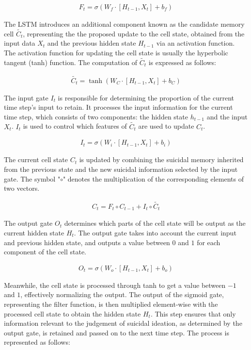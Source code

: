 \documentclass[ %
                    author={Bocheng Wang},
                supervisor={Dr. Qiang Liu},
                    degree={MSc},
                     title={A Research on Identification of Suicide Ideation in Texts with Multiple Models},
                      type={},
                      year={2024}]{dissertation}
\begin{document}
\begin{eqnarray}
      F_t = \sigma(W_f\cdot[H_{t-1}, X_t] + b_f)
      \label{forgetgate}
\end{eqnarray}

The LSTM introduces an additional component known as the candidate memory cell $\tilde{C_t}$, representing the the proposed update to the cell state, obtained from the input data $X_t$ and the previous hidden state $H_{t-1}$ via an activation function. The activation function for updating the cell state is usually the hyperbolic tangent (tanh) function. The computation of $\tilde{C_t}$ is expressed as follows:

\begin{eqnarray}
      \tilde{C_t} = \tanh(W_C\cdot[H_{t-1}, X_t] + b_C)
      \label{ctilde}
\end{eqnarray}

The input gate $I_t$ is responsible for determining the proportion of the current time step's input to retain. It processes the input information for the current time step, which consists of two components: the hidden state $h_{t-1}$ and the input $X_t$. $I_t$ is used to control which features of $\tilde{C_t}$ are used to update $C_t$.

\begin{eqnarray}
      I_t = \sigma(W_i\cdot[H_{t-1}, X_t] + b_i)
      \label{inputgate}
\end{eqnarray}

The current cell state $C_t$ is updated by combining the suicidal memory inherited from the previous state and the new suicidal information selected by the input gate. The symbol "$\circ$" denotes the multiplication of the corresponding elements of two vectors.

\begin{eqnarray}
      C_t = F_t \circ C_{t-1} + I_t \circ \tilde{C_t}
      \label{ct}
\end{eqnarray}

The output gate $O_t$ determines which parts of the cell state will be output as the current hidden state $H_t$. The output gate takes into account the current input and previous hidden state, and outputs a value between $0$ and $1$ for each component of the cell state.

\begin{eqnarray}
      O_t = \sigma(W_o\cdot[H_{t-1}, X_t] + b_o)
      \label{outputgate}
\end{eqnarray}

Meanwhile, the cell state is processed through tanh to get a value between $-1$ and $1$, effectively normalizing the output. The output of the sigmoid gate, representing the filter function, is then multiplied element-wise with the processed cell state to obtain the hidden state $H_t$. This step ensures that only information relevant to the judgement of suicidal ideation, as determined by the output gate, is retained and passed on to the next time step. The process is represented as follows:
\end{document}
